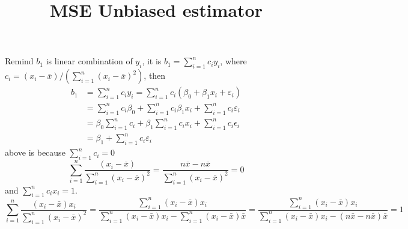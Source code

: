 \documentclass[11pt,letterpaper]{article}
\title{MSE Unbiased estimator}
\author{}
\date{}
\newcommand\sumin{\sum_{i=1}^n}
\begin{document}
\maketitle
\thispagestyle{empty}

Remind $b_1$ is linear combination of $y_i$, it is $b_1=\sumin c_iy_i$, where $c_i=(x_i-\bar{x})/(\sumin(x_i-\bar{x})^2)$, then 
\begin{align*}
b_1 &=\sumin c_iy_i =\sumin c_i(\beta_0 + \beta_1x_i + \varepsilon_i )\\
&=\sumin c_i\beta_0 + \sumin c_i\beta_1 x_i +\sumin c_i\varepsilon_i\\
&= \beta_0\sumin c_i + \beta_1\sumin c_ix_i + \sumin c_i\epsilon_i\\
&= \beta_1 + \sumin c_i\varepsilon_i
\end{align*}
above is because $\sumin c_i=0$
\[\sumin \frac{(x_i-\bar{x})}{\sumin (x_i-\bar{x})^2}=\frac{n\bar{x}-n\bar{x}}{\sumin (x_i -\bar{x})^2}=0\]
and $\sumin c_ix_i=1$.\[\sumin\frac{(x_i - \bar{x})x_i }{\sumin (x_i -\bar{x})^2}=\frac{\sumin (x_i-\bar{x})x_i}{\sumin (x_i-\bar{x})x_i - \sumin(x_i -\bar{x})\bar{x}}=\frac{\sumin(x_i-\bar{x})x_i}{\sumin(x_i - \bar{x})x_i - (n\bar{x} - n\bar{x})\bar{x}}=1\]
\end{document}
